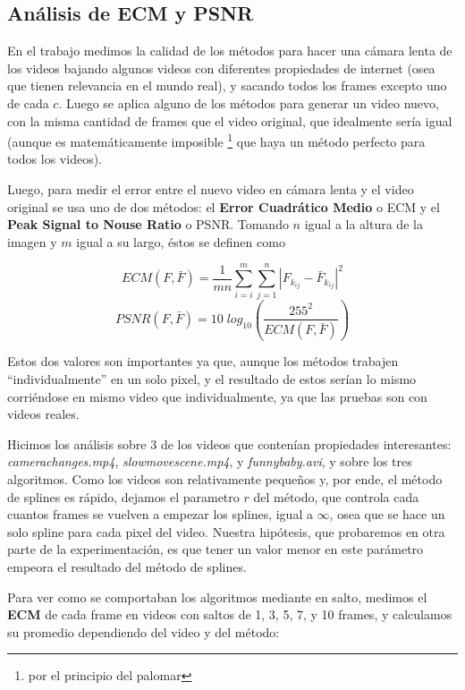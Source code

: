 \subsection {An\'alisis de ECM y PSNR}

En el trabajo medimos la calidad de los m\'etodos para hacer una c\'amara lenta
de los videos bajando algunos videos con diferentes propiedades de internet
(osea que tienen relevancia en el mundo real), y sacando todos los frames
excepto uno de cada $c$. Luego se aplica alguno de los m\'etodos para generar un
video nuevo, con la misma cantidad de frames que el video original, que
idealmente ser\'ia igual (aunque es matem\'aticamente imposible \footnote{por el
principio del palomar} que haya un m\'etodo perfecto para todos los videos).

Luego, para medir el error entre el nuevo video en c\'amara lenta y el video
original se usa uno de dos m\'etodos: el \textbf{Error Cuadr\'atico Medio} o ECM
y el \textbf{Peak Signal to Nouse Ratio} o PSNR. Tomando $n$ igual a la altura 
de la imagen y $m$ igual a su largo, \'estos se definen como

\[
ECM(F, \bar{F}) = \frac{1}{m n} \sum^m_{i = i} \sum^n_{j = 1} \left| F_{k_{i j}} - \bar{F}_{k_{i j}} \right|^2
\]
\[
PSNR(F, \bar{F}) = 10 \; log_{10} \left( \frac{255^2}{ECM(F, \bar{F})} \right)
\]

Estos dos valores son importantes ya que, aunque los m\'etodos trabajen
``individualmente'' en un solo pixel, y el resultado de estos ser\'ian lo mismo
corri\'endose en mismo video que individualmente, ya que las pruebas son con videos
reales.

Hicimos los an\'alisis sobre 3 de los videos que conten\'ian propiedades
interesantes: \textit{camerachanges.mp4}, \textit{slowmovescene.mp4}, y
\textit{funnybaby.avi}, y sobre los tres algoritmos. Como los videos son
relativamente peque\~nos y, por ende, el m\'etodo de splines es r\'apido,
dejamos el parametro $r$ del m\'etodo, que controla cada cuantos frames se
vuelven a empezar los splines, igual a $\infty$, osea que se hace un solo spline
para cada pixel del video. Nuestra hip\'otesis, que probaremos en otra parte de
la experimentaci\'on, es que tener un valor menor en este par\'ametro empeora el
resultado del m\'etodo de splines.

Para ver como se comportaban los algoritmos mediante en salto, medimos el
\textbf{ECM} de cada frame en videos con saltos de 1, 3, 5, 7, y 10 frames, y
calculamos su promedio dependiendo del video y del m\'etodo:

